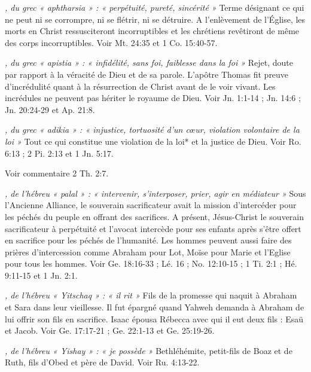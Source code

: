 \begin{multicols}{2}
\textit{, du grec « aphtharsia » : « perpétuité, pureté, sincérité »}\newline
Terme désignant ce qui ne peut ni se corrompre, ni se flétrir, ni se détruire. A l'enlèvement de l'Église, les morts en Christ ressusciteront incorruptibles et les chrétiens revêtiront de même des corps incorruptibles. Voir Mt. 24:35 et 1 Co. 15:40-57.

\textit{, du grec « apistia » : « infidélité, sans foi, faiblesse dans la foi »}\newline
Rejet, doute par rapport à la véracité de Dieu et de sa parole. L'apôtre Thomas fit preuve d'incrédulité quant à la résurrection de Christ avant de le voir vivant. Les incrédules ne peuvent pas hériter le royaume de Dieu. Voir Jn. 1:1-14 ; Jn. 14:6 ; Jn. 20:24-29 et Ap. 21:8.

\textit{, du grec « adikia » : « injustice, tortuosité d'un cœur, violation volontaire de la loi »}\newline
Tout ce qui constitue une violation de la loi* et la justice de Dieu. Voir Ro. 6:13 ; 2 Pi. 2:13 et 1 Jn. 5:17.

\textit{}\newline
Voir commentaire 2 Th. 2:7.

\textit{, de l'hébreu « palal » : « intervenir, s'interposer, prier, agir en médiateur »}\newline
Sous l'Ancienne Alliance, le souverain sacrificateur avait la mission d'intercéder pour les péchés du peuple en offrant des sacrifices. A présent, Jésus-Christ le souverain sacrificateur à perpétuité et l'avocat intercède pour ses enfants après s'être offert en sacrifice pour les péchés de l'humanité. Les hommes peuvent aussi faire des prières d'intercession comme Abraham pour Lot, Moïse pour Marie et l'Eglise pour tous les hommes. Voir Ge. 18:16-33 ; Lé. 16 ; No. 12:10-15 ; 1 Ti. 2:1 ; Hé. 9:11-15 et 1 Jn. 2:1.

\textit{, de l'hébreu « Yitschaq » : « il rit »}\newline
Fils de la promesse qui naquit à Abraham et Sara dans leur vieillesse. Il fut épargné quand Yahweh demanda à Abraham de lui offrir son fils en sacrifice. Isaac épousa Rébecca avec qui il eut deux fils : Esaü et Jacob. Voir Ge. 17:17-21 ; Ge. 22:1-13 et Ge. 25:19-26.

\textit{, de l'hébreu « Yishay » : « je possède »}\newline
Bethléhémite, petit-fils de Boaz et de Ruth, fils d'Obed et père de David. Voir Ru. 4:13-22.


\end{multicols}
